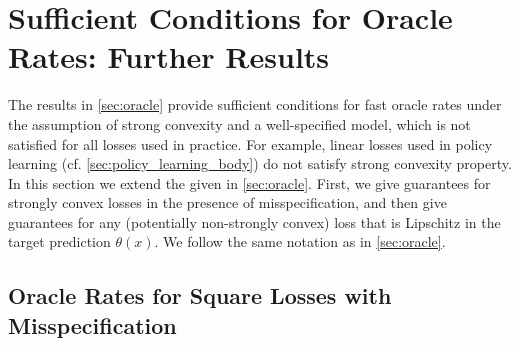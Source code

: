 \documentclass[11pt]{article} %
\newcommand{\pref}[1]{\cref{#1}}
\theoremstyle{theorem}  %
\theoremstyle{plain}
\begin{document}
%
%
\section{Sufficient Conditions for Oracle Rates: Further Results}
\label{sec:oracle_lipschitz}
%
%

The results in \pref{sec:oracle} provide sufficient conditions for fast oracle rates under the assumption of strong convexity and a well-specified model, which is not satisfied for all losses used in practice. For example, linear losses used in policy learning (cf. \pref{sec:policy_learning_body}) do not satisfy strong convexity property. In this section we extend the  given in \pref{sec:oracle}. First, we give guarantees for strongly convex losses in the presence of misspecification, and then give guarantees for any (potentially non-strongly convex) loss that is Lipschitz in the target prediction $\theta(x)$. We follow the same notation as in \pref{sec:oracle}.

\subsection{Oracle Rates for Square Losses with Misspecification}
\end{document}
